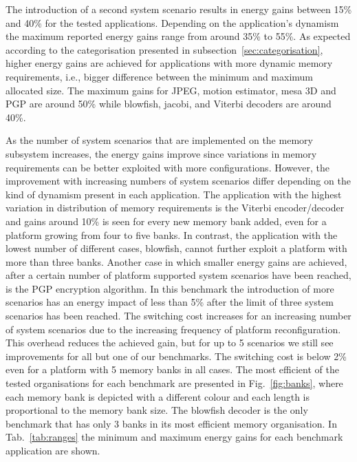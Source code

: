 \documentclass[a4paper,conference]{IEEEtran}
\begin{document}
The introduction of a second system scenario results in energy gains between 15\% and  40\%  for the tested applications. Depending on the application's dynamism the maximum reported energy gains range from around 35\% to 55\%. As expected according to the categorisation presented in subsection~\ref{sec:categorisation}, higher energy gains are achieved for applications with more dynamic memory requirements, i.e., bigger difference between the minimum and maximum allocated size. The maximum gains for JPEG, motion estimator, mesa 3D and PGP are around 50\% while blowfish, jacobi, and Viterbi decoders are around 40\%.

As the number of system scenarios that are implemented on the memory subsystem increases, the energy gains improve since variations in memory requirements can be better exploited with more configurations. However, the improvement with increasing numbers of system scenarios differ depending on the kind of dynamism present in each application. The application with the highest variation in distribution of memory requirements is the Viterbi encoder/decoder and gains around 10\% is seen for every new memory bank added, even for a platform growing from four to five banks. In contrast, the application with the lowest number of different cases, blowfish, cannot further exploit a platform with more than three banks. Another case in which smaller energy gains are achieved, after a certain number of platform supported system scenarios have been reached, is the PGP encryption algorithm. In this benchmark the introduction of more scenarios has an energy impact of less than 5\% after the limit of three system scenarios has been reached. The switching cost increases for an increasing number of system scenarios due to the increasing frequency of platform reconfiguration. This overhead reduces the achieved gain, but for up to 5 scenarios we still see improvements for all but one of our benchmarks. The switching cost is below 2\% even for a platform with 5 memory banks in all cases. The most efficient of the tested organisations for each benchmark are presented in Fig.~\ref{fig:banks}, where each memory bank is depicted with a different colour and each length is proportional to the memory bank size. The blowfish decoder is the only benchmark that has only 3 banks in its most efficient memory organisation. In Tab.~\ref{tab:ranges} the minimum and maximum energy gains for each benchmark application are shown. 
\end{document}
